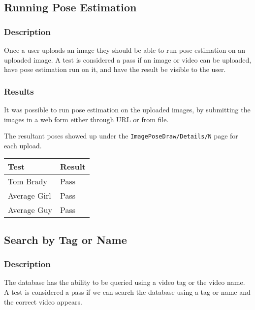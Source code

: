 \documentclass{scrreprt}
\begin{document}
\subsection{Running Pose Estimation}
\subsubsection{Description}

Once a user uploads an image they should be able to run pose estimation on an
uploaded image. A test is considered a pass if an image or video can be
uploaded, have pose estimation run on it, and have the result be visible to the
user.

\subsubsection{Results}

It was possible to run pose estimation on the uploaded images, by submitting
the images in a web form either through URL or from file.

The resultant poses showed up under the \verb|ImagePoseDraw/Details/N| page for
each upload.

\begin{table}[H]
        \centering
        \begin{tabular}{||p{2.5cm}|p{2.5cm}||}
                \hline
                \textbf Test & \textbf Result\\
                \hline\hline
                Tom Brady & Pass  \\
                \hline\hline
                Average Girl & Pass  \\
                \hline\hline
                Average Guy & Pass  \\
                \hline
        \end{tabular}
\end{table}

\subsection{Search by Tag or Name}
\subsubsection{Description}

The database has the ability to be queried using a video tag or the video name.
A test is considered a pass if we can search the database using a tag or name
and the correct video appears.
\end{document}
